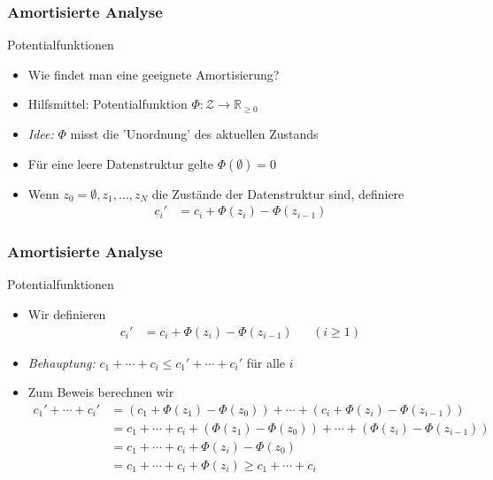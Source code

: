 \documentclass[aspectratio=1610, 11pt]{beamer}
\begin{document}
\begin{frame}\frametitle{Amortisierte Analyse}
	\begin{exampleblock}{Potentialfunktionen}
		\begin{itemize}
			\item Wie findet man eine geeignete Amortisierung?
			\item \alert{Hilfsmittel:} Potentialfunktion $\Phi:\mathcal Z\to\mathbb R_{\geq0}$
			\item \emph{Idee:} $\Phi$ misst die 'Unordnung' des aktuellen Zustands
			\item F\"ur eine leere Datenstruktur gelte $\Phi(\emptyset)=0$
			\item Wenn $z_0=\emptyset,z_1,\ldots,z_N$ die Zust\"ande der Datenstruktur sind, definiere
				\begin{align*}
					c_i'&=c_i+\Phi(z_i)-\Phi(z_{i-1})
				\end{align*}
		\end{itemize}
	\end{exampleblock}
\end{frame}

\begin{frame}\frametitle{Amortisierte Analyse}
	\begin{exampleblock}{Potentialfunktionen}
		\begin{itemize}
			\item Wir definieren 
				\begin{align*}
					c_i'&=c_i+\Phi(z_i)-\Phi(z_{i-1})&&(i\geq1)
				\end{align*}
			\item \emph{Behauptung:} $c_1+\cdots+c_i\leq c_1'+\cdots+c_i'$ f\"ur alle $i$
			\item Zum Beweis berechnen wir
				\begin{align*}
					c_1'+\cdots+c_i'&=(c_1+\Phi(z_1)-\Phi(z_0))+\cdots+(c_i+\Phi(z_i)-\Phi(z_{i-1}))\\
									&=c_1+\cdots+c_i+(\Phi(z_1)-\Phi(z_0))+\cdots+(\Phi(z_i)-\Phi(z_{i-1}))\\
									&=c_1+\cdots+c_i+\Phi(z_i)-\Phi(z_0)\\
									&=c_1+\cdots+c_i+\Phi(z_i)\geq c_1+\cdots+c_i
				\end{align*}
		\end{itemize}
	\end{exampleblock}
\end{frame}
\end{document}
